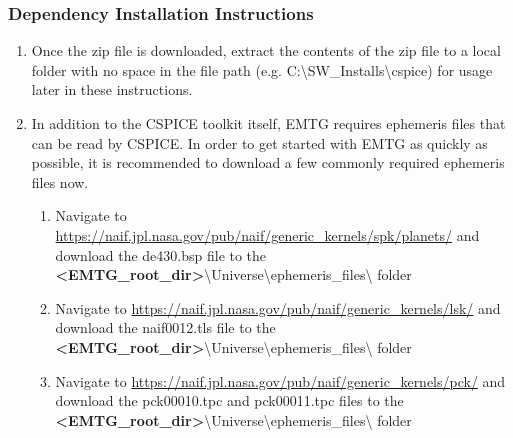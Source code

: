\subsubsection{Dependency Installation Instructions}
\begin{enumerate}
	\item Once the zip file is downloaded, extract the contents of the zip file to a local folder with no space in the file path (e.g. C:\textbackslash SW\_Installs\textbackslash cspice) for usage later in these instructions.
	\item In addition to the CSPICE toolkit itself, EMTG requires ephemeris files that can be read by CSPICE. In order to get started with EMTG as quickly as possible, it is recommended to download a few commonly required ephemeris files now.
	\begin{enumerate}
		\item Navigate to \url{https://naif.jpl.nasa.gov/pub/naif/generic_kernels/spk/planets/} and download the de430.bsp file to the \textbf{\textless EMTG\_root\_dir\textgreater}\textbackslash Universe\textbackslash ephemeris\_files\textbackslash \hspace{1pt} folder
		\item Navigate to \url{https://naif.jpl.nasa.gov/pub/naif/generic_kernels/lsk/} and download the naif0012.tls file to the \textbf{\textless EMTG\_root\_dir\textgreater}\textbackslash Universe\textbackslash ephemeris\_files\textbackslash \hspace{1pt} folder
		\item Navigate to \url{https://naif.jpl.nasa.gov/pub/naif/generic_kernels/pck/} and download the pck00010.tpc and pck00011.tpc files to the \\ \textbf{\textless EMTG\_root\_dir\textgreater}\textbackslash Universe\textbackslash ephemeris\_files\textbackslash \hspace{1pt} folder
	\end{enumerate}
\end{enumerate}
